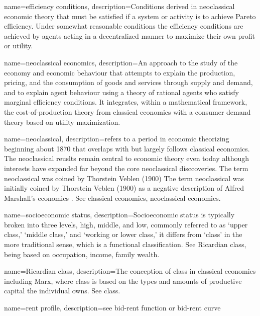 {
name=efficiency conditions,
description={Conditions derived in neoclassical economic theory that must be satisfied if a system or activity is to achieve Pareto efficiency. Under somewhat reasonable conditions the efficiency conditions are achieved by agents acting in a decentralized manner to maximize their own profit or utility.}
}

{
name=neoclassical economics,
description={An approach to the study of the economy and economic behaviour that attempts to explain the production, pricing, and the consumption of goods and services through supply and demand, and to explain agent behaviour using a theory of rational agents who satisfy \gls{marginal} efficiency conditions. It integrates, within a mathematical framework, the cost-of-production theory from classical economics with a consumer demand theory based on utility maximization.}
}


{
name=neoclassical,
description={refers to a period in economic  theorizing beginning about 1870 that overlaps with  but largely follows classical economics. The neoclassical reuslts remain central to economic theory even today although interests have expanded far beyond the core neoclassical disccoveries. The term neoclassical was  coined by Thorstein Veblen (1900) The term neoclassical was initially coined by Thorstein Veblen (1900) as a negative description of Alfred Marshall's economics \cite{colanderDeathNeoclassicalEconomics2000}. See \gls{classical economics},  \gls{neoclassical economics}. }
}


{
name=socioeconomic status,
description={Socioeconomic status is typically broken into three levels, high, middle, and low,  commonly referred to as `upper class,' `middle class,' and `working or lower class,' it differs from `\gls{class}' in the more traditional sense, which is a functional classification. See \gls{Ricardian class}, being based on occupation, income, family wealth.}
}

{
name=Ricardian class,
description={The conception of class in \gls{classical economics} including Marx, where class is based on the types and amounts of productive capital the individual owns. See \gls{class}.}
}

{
name=rent profile,
description={see \gls{bid-rent function} or \gls{bid-rent curve}}
}

